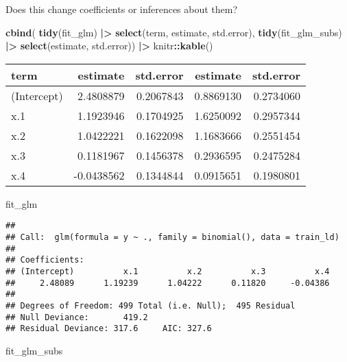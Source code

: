 \documentclass[
]{article}
\newenvironment{Shaded}{\begin{snugshade}}{\end{snugshade}}
\newcommand{\FunctionTok}[1]{\textcolor[rgb]{0.13,0.29,0.53}{\textbf{#1}}}
\newcommand{\NormalTok}[1]{#1}
\newcommand{\SpecialCharTok}[1]{\textcolor[rgb]{0.81,0.36,0.00}{\textbf{#1}}}
\begin{document}
Does this change coefficients or inferences about them?

\begin{Shaded}
\begin{Highlighting}[]
\FunctionTok{cbind}\NormalTok{(}
  \FunctionTok{tidy}\NormalTok{(fit\_glm) }\SpecialCharTok{|\textgreater{}} \FunctionTok{select}\NormalTok{(term, estimate, std.error),}
  \FunctionTok{tidy}\NormalTok{(fit\_glm\_subs) }\SpecialCharTok{|\textgreater{}} \FunctionTok{select}\NormalTok{(estimate, std.error)) }\SpecialCharTok{|\textgreater{}}
\NormalTok{  knitr}\SpecialCharTok{::}\FunctionTok{kable}\NormalTok{()}
\end{Highlighting}
\end{Shaded}

\begin{longtable}[]{@{}lrrrr@{}}
\toprule\noalign{}
term & estimate & std.error & estimate & std.error \\
\midrule\noalign{}
\endhead
\bottomrule\noalign{}
\endlastfoot
(Intercept) & 2.4808879 & 0.2067843 & 0.8869130 & 0.2734060 \\
x.1 & 1.1923946 & 0.1704925 & 1.6250092 & 0.2957344 \\
x.2 & 1.0422221 & 0.1622098 & 1.1683666 & 0.2551454 \\
x.3 & 0.1181967 & 0.1456378 & 0.2936595 & 0.2475284 \\
x.4 & -0.0438562 & 0.1344844 & 0.0915651 & 0.1980801 \\
\end{longtable}

\begin{Shaded}
\begin{Highlighting}[]
\NormalTok{fit\_glm}
\end{Highlighting}
\end{Shaded}

\begin{verbatim}
## 
## Call:  glm(formula = y ~ ., family = binomial(), data = train_ld)
## 
## Coefficients:
## (Intercept)          x.1          x.2          x.3          x.4  
##     2.48089      1.19239      1.04222      0.11820     -0.04386  
## 
## Degrees of Freedom: 499 Total (i.e. Null);  495 Residual
## Null Deviance:       419.2 
## Residual Deviance: 317.6     AIC: 327.6
\end{verbatim}

\begin{Shaded}
\begin{Highlighting}[]
\NormalTok{fit\_glm\_subs}
\end{Highlighting}
\end{Shaded}
\end{document}
